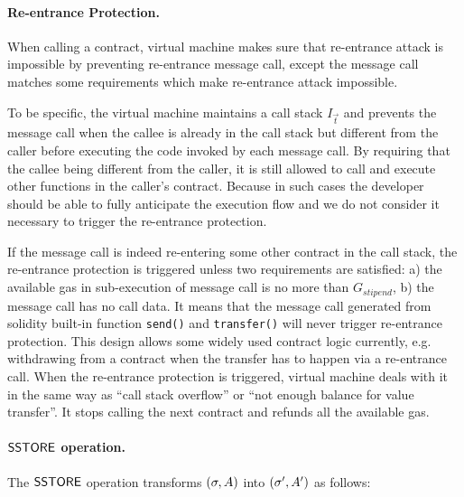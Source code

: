 \paragraph{Re-entrance Protection.}

When calling a contract, {\name} virtual machine makes sure that re-entrance attack is impossible by preventing re-entrance message call, except the message call matches some requirements which make re-entrance attack impossible. 

To be specific, the {\name} virtual machine maintains a call stack $I_\vec{t}$ and 
prevents the message call
when the callee is already in the call stack but different from the caller before executing the code invoked by each message call.
By requiring that the callee being different from the caller, it is still allowed to call and execute other functions in the caller's contract.
Because in such cases the developer should be able to fully anticipate the execution flow
and we do not consider it necessary to trigger the re-entrance protection.

If the message call is indeed re-entering some other contract in the call stack,
the re-entrance protection is triggered 
unless two requirements are satisfied: a) the available gas in sub-execution of message call is no more than $G_{stipend}$, 
b) the message call has no call data. 
It means that the message call generated from solidity built-in function {\tt send()} and {\tt transfer()} will never trigger
re-entrance protection. This design allows some widely used contract logic currently, 
e.g. withdrawing \cfx from a contract when the transfer has to happen via a re-entrance call. 
%
When the re-entrance protection is triggered, {\name} virtual machine deals with it in the same way as ``call stack overflow'' or ``not enough balance for value transfer''. It stops calling the next contract and refunds all the available gas.


\paragraph{$\mathsf{SSTORE}$ operation.} 
The $\mathsf{SSTORE}$ operation transforms $(\mathbf{\sigma},A)$ into $(\mathbf{\sigma}',A')$ as follows:

